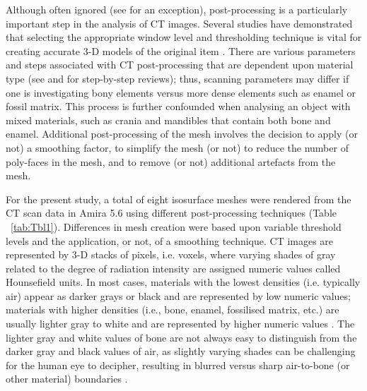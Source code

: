 \documentclass[review]{elsarticle}
\begin{document}
Although often ignored (see \citealt{RN8984} for an exception), post-processing is a particularly important step in the analysis of CT images. Several studies have demonstrated that selecting the appropriate window level and thresholding technique is vital for creating accurate 3-D models of the original item \citep{RN11483,RN11485,RN11486}. There are various parameters and steps associated with CT post-processing that are dependent upon material type (see \citealt{RN11484} and \citealt{RN11478} for step-by-step reviews); thus, scanning parameters may differ if one is investigating bony elements versus more dense elements such as enamel or fossil matrix. This process is further confounded when analysing an object with mixed materials, such as crania and mandibles that contain both bone and enamel. Additional post-processing of the mesh involves the decision to apply (or not) a smoothing factor, to simplify the mesh (or not) to reduce the number of poly-faces in the mesh, and to remove (or not) additional artefacts from the mesh. 

For the present study, a total of eight isosurface meshes were rendered from the CT scan data in Amira 5.6 \citep{RN5898} using different post-processing techniques (Table ~\ref{tab:Tbl1}). Differences in mesh creation were based upon variable threshold levels and the application, or not, of a smoothing technique. CT images are represented by 3-D stacks of pixels, i.e. voxels, where varying shades of gray related to the degree of radiation intensity are assigned numeric values called Hounsefield units. In most cases, materials with the lowest densities (i.e. typically air) appear as darker grays or black and are represented by low numeric values; materials with higher densities (i.e., bone, enamel, fossilised matrix, etc.) are usually lighter gray to white and are represented by higher numeric values \citep{RN11484,RN11482}. The lighter gray and white values of bone are not always easy to distinguish from the darker gray and black values of air, as slightly varying shades can be challenging for the human eye to decipher, resulting in blurred versus sharp air-to-bone (or other material) boundaries \citep{RN11478}. 
\end{document}
